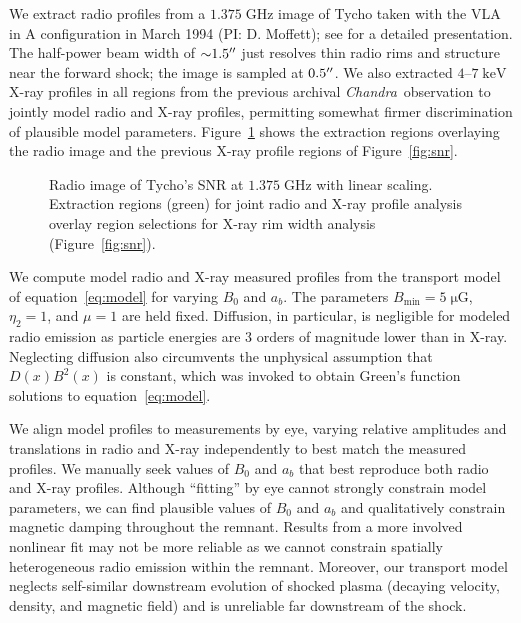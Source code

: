 \documentclass[iop, apj, numberedappendix]{emulateapj}
\newcommand*{\mt}{\mathrm}
\newcommand*{\unit}[1]{\;\mt{#1}}  %
\newcommand*{\abt}{\mathord{\sim}} %
\newcommand*{\Chandra}{\textit{Chandra}\ }
\newcommand*{\muG}{\unit{\mu G}}
\begin{document}
We extract radio profiles from a $1.375 \unit{GHz}$ image of Tycho taken
with the VLA in A configuration in March 1994 (PI: D. Moffett); see
\citet{reynoso1997} for a detailed presentation.
The half-power beam width of $\abt 1.5\arcsec$ just resolves thin radio rims
and structure near the forward shock; the image is sampled at $0.5\mbox{$^{\prime\prime}$}$.
We also extracted $4$--$7 \unit{keV}$ X-ray profiles in all regions from the
previous archival \Chandra observation to jointly model radio and X-ray
profiles, permitting somewhat firmer discrimination of plausible model
parameters.  Figure~\ref{fig:radio-snr} shows the extraction regions overlaying
the radio image and the previous X-ray profile regions of Figure~\ref{fig:snr}.

\begin{figure}
    \centering
    \iftoggle{manuscript}{
        \texttt{[image: figures/radio-snr-inv.png]}
    }{
        \plotone{figures/radio-snr-inv.png}
    }
    \caption{Radio image of Tycho's SNR at $1.375 \unit{GHz}$ with linear
    scaling.  Extraction regions (green) for joint radio and X-ray profile
    analysis overlay region selections for X-ray rim width analysis
    (Figure~\ref{fig:snr}). \label{fig:radio-snr}}
\end{figure}

We compute model radio and X-ray measured profiles from the transport model of
equation~\eqref{eq:model} for varying $B_0$ and $a_b$.  The parameters
$B_{\mt{min}} = 5 \muG$, $\eta_2 = 1$, and $\mu = 1$ are held fixed.
Diffusion, in particular, is negligible for modeled radio emission as particle
energies are 3 orders of magnitude lower than in X-ray.  Neglecting diffusion
also circumvents the unphysical assumption that $D(x) B^2(x)$ is constant,
which was invoked to obtain Green's function solutions to
equation~\eqref{eq:model}.

We align model profiles to measurements by eye, varying relative amplitudes and
translations in radio and X-ray independently to best match the measured
profiles.  We manually seek values of $B_0$ and $a_b$ that best reproduce both
radio and X-ray profiles.  Although ``fitting'' by eye cannot strongly
constrain model parameters, we can find plausible values of $B_0$ and $a_b$
and qualitatively constrain magnetic damping throughout the remnant.  Results
from a more involved nonlinear fit may not be more reliable as we cannot
constrain spatially heterogeneous radio emission within the remnant.  Moreover,
our transport model neglects self-similar downstream evolution of shocked
plasma (decaying velocity, density, and magnetic field) and is unreliable far
downstream of the shock.
\end{document}
